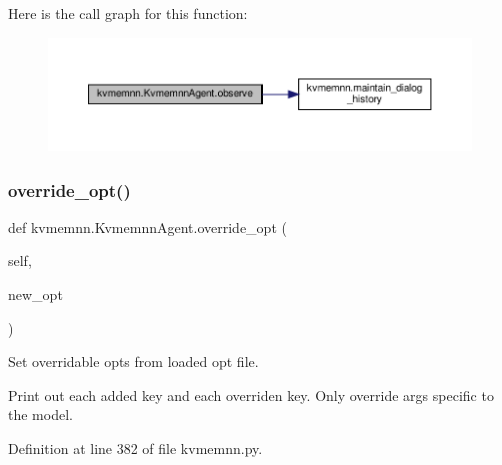 Here is the call graph for this function\+:
\nopagebreak
\begin{figure}[H]
\begin{center}
\leavevmode
\includegraphics[width=350pt]{classkvmemnn_1_1KvmemnnAgent_a54b08c3fbe7f12d55a8ea6669b18726d_cgraph}
\end{center}
\end{figure}
\mbox{\label{classkvmemnn_1_1KvmemnnAgent_ae0c109b266a7d5d1585dc9247334cf89}} 
\subsubsection{\texorpdfstring{override\+\_\+opt()}{override\_opt()}}
{\footnotesize\ttfamily def kvmemnn.\+Kvmemnn\+Agent.\+override\+\_\+opt (\begin{DoxyParamCaption}\item[{}]{self,  }\item[{}]{new\+\_\+opt }\end{DoxyParamCaption})}

\begin{DoxyVerb}Set overridable opts from loaded opt file.

Print out each added key and each overriden key.
Only override args specific to the model.
\end{DoxyVerb}
 

Definition at line 382 of file kvmemnn.\+py.



